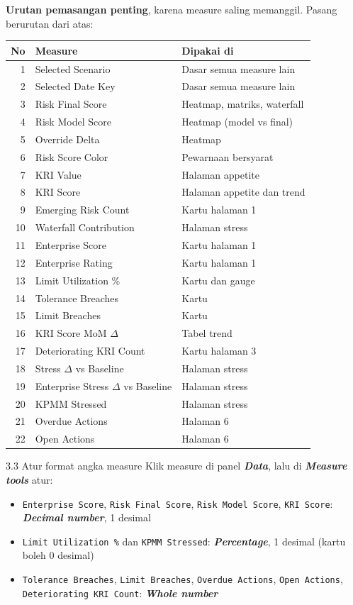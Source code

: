 \documentclass[11pt,a4paper]{article}
\newcommand{\file}[1]{\texttt{\small #1}}
\newcommand{\ui}[1]{\textbf{\textit{#1}}}
\begin{document}
\textbf{Urutan pemasangan penting}, karena measure saling memanggil. Pasang berurutan dari atas:

\begin{center}
\begin{tabularx}{\linewidth}{r>{\ttfamily\small}p{5.0cm}X}
\toprule
\textbf{No} & \textrm{\textbf{Measure}} & \textbf{Dipakai di} \\
\midrule
1 & Selected Scenario & Dasar semua measure lain \\
2 & Selected Date Key & Dasar semua measure lain \\
3 & Risk Final Score & Heatmap, matriks, waterfall \\
4 & Risk Model Score & Heatmap (model vs final) \\
5 & Override Delta & Heatmap \\
6 & Risk Score Color & Pewarnaan bersyarat \\
7 & KRI Value & Halaman appetite \\
8 & KRI Score & Halaman appetite dan trend \\
9 & Emerging Risk Count & Kartu halaman 1 \\
10 & Waterfall Contribution & Halaman stress \\
11 & Enterprise Score & Kartu halaman 1 \\
12 & Enterprise Rating & Kartu halaman 1 \\
13 & Limit Utilization \% & Kartu dan gauge \\
14 & Tolerance Breaches & Kartu \\
15 & Limit Breaches & Kartu \\
16 & KRI Score MoM $\Delta$ & Tabel trend \\
17 & Deteriorating KRI Count & Kartu halaman 3 \\
18 & Stress $\Delta$ vs Baseline & Halaman stress \\
19 & Enterprise Stress $\Delta$ vs Baseline & Halaman stress \\
20 & KPMM Stressed & Halaman stress \\
21 & Overdue Actions & Halaman 6 \\
22 & Open Actions & Halaman 6 \\
\bottomrule
\end{tabularx}
\end{center}

\begin{stepbox}{3.3 Atur format angka measure}
Klik measure di panel \ui{Data}, lalu di \ui{Measure tools} atur:
\begin{itemize}
\item \file{Enterprise Score}, \file{Risk Final Score}, \file{Risk Model Score}, \file{KRI Score}: \ui{Decimal number}, 1 desimal
\item \file{Limit Utilization \%} dan \file{KPMM Stressed}: \ui{Percentage}, 1 desimal (kartu boleh 0 desimal)
\item \file{Tolerance Breaches}, \file{Limit Breaches}, \file{Overdue Actions}, \file{Open Actions}, \file{Deteriorating KRI Count}: \ui{Whole number}
\end{itemize}
\end{stepbox}
\end{document}
